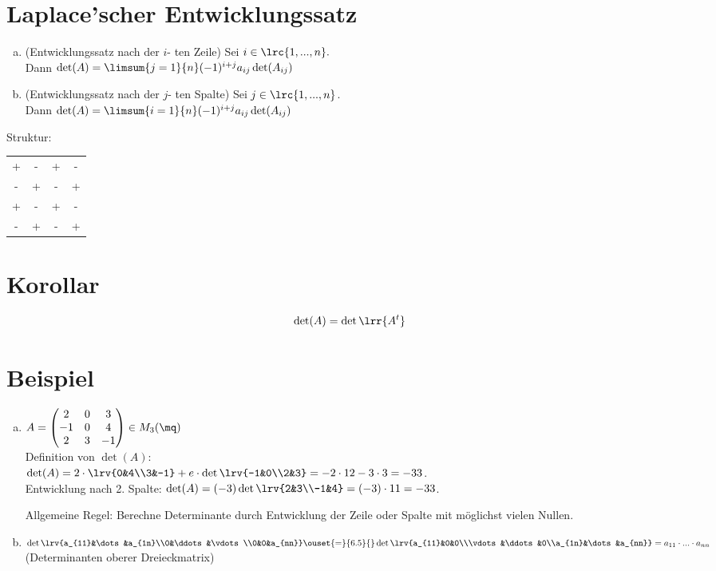 \section{Laplace'scher Entwicklungssatz}
  \begin{enumerate}[a)]
    \item (Entwicklungssatz nach der $i$- ten Zeile)
      Sei $i\in\lrc{1,...,n}.$\\
      Dann $\det(A)=\limsum{j=1}{n}(-1)^{i+j}a_{ij}\det(A_{ij})$
    \item (Entwicklungssatz nach der $j$- ten Spalte)
      Sei $j\in\lrc{1,...,n}$.\\
      Dann $\det(A)=\limsum{i=1}{n}(-1)^{i+j}a_{ij}\det(A_{ij})$
  \end{enumerate}
  Struktur:\begin{tabular}{cccc}+&-&+&-\\-&+&-&+\\+&-&+&-\\-&+&-&+\end{tabular}

\section{Korollar}
  \[\det(A)=\det\lrr{A^t}\]

\section{Beispiel}
  \begin{enumerate}[a)]
    \item $A=\begin{pmatrix}2&0&3\\-1&0&4\\2&3&-1\end{pmatrix}\in M_3(\mq)$\\
      Definition von $\det(A)$:\\
      $\det(A)=2\cdot\lrv{0&4\\3&-1}+e\cdot\det\lrv{-1&0\\2&3}=-2\cdot
      12-3\cdot 3=-33$.\\ Entwicklung nach 2. Spalte:
      $\det(A)=(-3)\det\lrv{2&3\\-1&4}=(-3)\cdot 11=-33$.

      Allgemeine Regel: Berechne Determinante durch Entwicklung der Zeile oder
      Spalte mit möglichst vielen Nullen.

    \item
      $\det\lrv{a_{11}&\dots&a_{1n}\\0&\ddots&\vdots\\0&0&a_{nn}}\ouset{=}{6.5}{}\det\lrv{a_{11}&0&0\\\vdots&\ddots&0\\a_{1n}&\dots&a_{nn}}=a_{11}\cdot...\cdot a_{nn}$\\
      (Determinanten oberer Dreieckmatrix)
  \end{enumerate}
